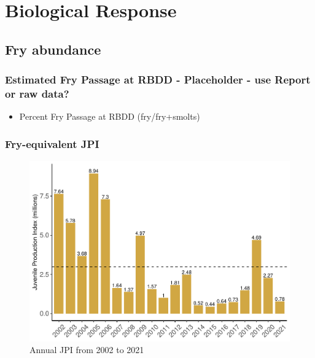 \documentclass[
]{book}
\providecommand{\tightlist}{%
  \setlength{\itemsep}{0pt}\setlength{\parskip}{0pt}}
\theoremstyle{definition}
\theoremstyle{definition}
\theoremstyle{definition}
\theoremstyle{definition}
\theoremstyle{remark}
\begin{document}
\hypertarget{biological-response-2}{%
\section{Biological Response}\label{biological-response-2}}

\hypertarget{fry-abundance}{%
\subsection{Fry abundance}\label{fry-abundance}}

\hypertarget{estimated-fry-passage-at-rbdd---placeholder---use-report-or-raw-data}{%
\subsubsection{Estimated Fry Passage at RBDD - Placeholder - use Report or raw data?}\label{estimated-fry-passage-at-rbdd---placeholder---use-report-or-raw-data}}

\begin{itemize}
\tightlist
\item
  Percent Fry Passage at RBDD (fry/fry+smolts)
\end{itemize}

\hypertarget{fry-equivalent-jpi}{%
\subsubsection{Fry-equivalent JPI}\label{fry-equivalent-jpi}}

\begin{figure}
\centering
\includegraphics{_main_files/figure-latex/JPI-fig-1.pdf}
\caption{\label{fig:JPI-fig}Annual JPI from 2002 to 2021}
\end{figure}
\end{document}
